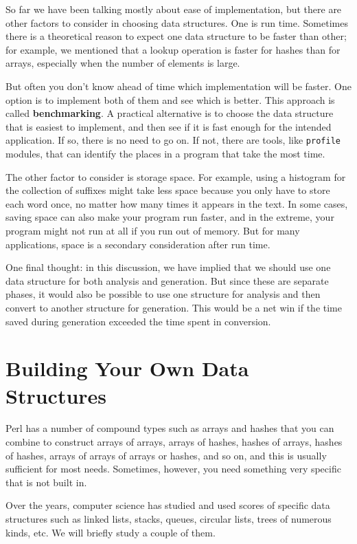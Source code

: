 So far we have been talking mostly about ease of implementation,
but there are other factors to consider in choosing data structures.
One is run time.  Sometimes there is a theoretical reason to expect
one data structure to be faster than other; for example, we mentioned
that a lookup operation is faster for hashes than for arrays,
especially when the number of elements is large.

But often you don't know ahead of time which implementation will
be faster.  One option is to implement both of them and see which
is better.  This approach is called {\bf benchmarking}.  A practical
alternative is to choose the data structure that is
easiest to implement, and then see if it is fast enough for the
intended application.  If so, there is no need to go on.  If not,
there are tools, like {\tt profile} modules, that can identify
the places in a program that take the most time.

The other factor to consider is storage space.  For example, using a
histogram for the collection of suffixes might take less space because
you only have to store each word once, no matter how many times it
appears in the text.  In some cases, saving space can also make your
program run faster, and in the extreme, your program might not run at
all if you run out of memory.  But for many applications, space is a
secondary consideration after run time.

One final thought: in this discussion, we have implied that
we should use one data structure for both analysis and generation.  But
since these are separate phases, it would also be possible to use one
structure for analysis and then convert to another structure for
generation.  This would be a net win if the time saved during
generation exceeded the time spent in conversion.

\section{Building Your Own Data Structures}

Perl has a number of compound types such as arrays and hashes 
that you can combine to construct arrays of arrays, arrays of 
hashes, hashes of arrays, hashes of hashes, arrays of arrays of 
arrays or hashes, and so on, and this is usually sufficient for 
most needs. Sometimes, however, you need something very specific 
that is not built in.

Over the years, computer science has studied and used scores of 
specific data structures such as linked lists, stacks, queues, 
circular lists, trees of numerous kinds, etc. We will briefly 
study a couple of them.

